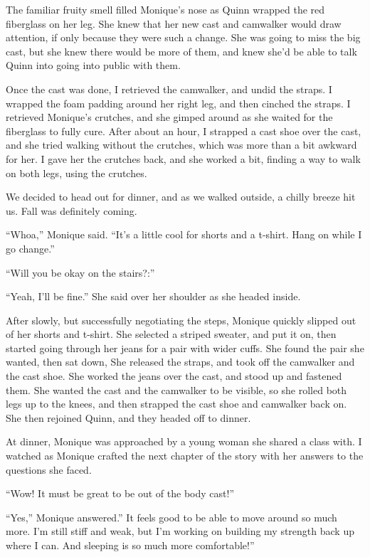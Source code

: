 The familiar fruity smell filled Monique's nose as Quinn wrapped the red fiberglass on her
leg. She knew that her new cast and camwalker would draw attention, if only because they were
such a change. She was going to miss the big cast, but she knew there would be more of them, and
knew she'd be able to talk Quinn into going into public with them.

Once the cast was done, I retrieved the camwalker, and undid the straps. I wrapped the foam
padding around her right leg, and then cinched the straps. I retrieved Monique's crutches, and
she gimped around as she waited for the fiberglass to fully cure. After about an hour, I
strapped a cast shoe over the cast, and she tried walking without the crutches, which was more
than a bit awkward for her. I gave her the crutches back, and she worked a bit, finding a way to
walk on both legs, using the crutches.

We decided to head out for dinner, and as we walked outside, a chilly breeze hit us. Fall
was definitely coming.

``Whoa,'' Monique said. ``It's a little cool for shorts and a t-shirt. Hang on while I go
change.''

``Will you be okay on the stairs?:''

``Yeah, I'll be fine.'' She said over her shoulder as she headed inside.

After slowly, but successfully negotiating the steps, Monique quickly slipped out of her
shorts and t-shirt. She selected a striped sweater, and put it on, then started going through
her jeans for a pair with wider cuffs. She found the pair she wanted, then sat down, She
released the straps, and took off the camwalker and the cast shoe. She worked the jeans over the
cast, and stood up and fastened them. She wanted the cast and the camwalker to be visible, so
she rolled both legs up to the knees, and then strapped the cast shoe and camwalker back on. She
then rejoined Quinn, and they headed off to dinner.

At dinner, Monique was approached by a young woman she shared a class with. I watched as
Monique crafted the next chapter of the story with her answers to the questions she faced.

``Wow! It must be great to be out of the body cast!''

``Yes,'' Monique answered.'' It feels good to be able to move around so much more. I'm still
stiff and weak, but I'm working on building my strength back up where I can. And sleeping is so
much more comfortable!''

